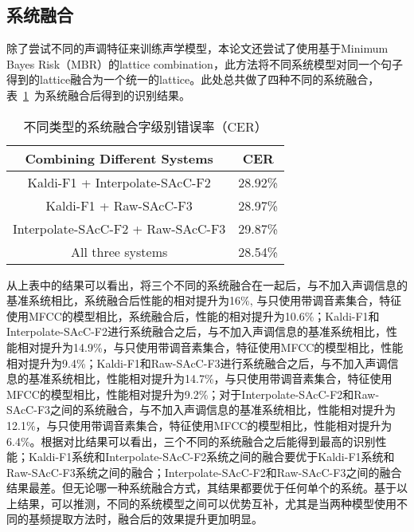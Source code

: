 \subsection{系统融合}
除了尝试不同的声调特征来训练声学模型，本论文还尝试了使用基于Minimum Bayes Risk（MBR）的lattice combination\cite{xu2011minimum}，此方法将不同系统模型对同一个句子得到的lattice融合为一个统一的lattice。此处总共做了四种不同的系统融合，表~\ref{tab:table5}~为系统融合后得到的识别结果。
\begin{table}[htbp]
\caption{不同类型的系统融合字级别错误率（CER）}\label{tab:table5}
\vspace{0.5em}\centering\wuhao
\begin{tabular}{cc}
\toprule[1.5pt]
Combining Different Systems & CER \\
\midrule[1pt]
Kaldi-F1 + Interpolate-SAcC-F2 & 28.92\% \\
Kaldi-F1 + Raw-SAcC-F3 & 28.97\% \\
Interpolate-SAcC-F2 + Raw-SAcC-F3 & 29.87\% \\
All three systems & 28.54\% \\
\bottomrule[1.5pt]
\end{tabular}
\vspace{\baselineskip}
\end{table}

从上表中的结果可以看出，将三个不同的系统融合在一起后，与不加入声调信息的基准系统相比，系统融合后性能的相对提升为16\%, 与只使用带调音素集合，特征使用MFCC的模型相比，系统融合后，性能的相对提升为10.6\%；Kaldi-F1和Interpolate-SAcC-F2进行系统融合之后，与不加入声调信息的基准系统相比，性能相对提升为14.9\%，与只使用带调音素集合，特征使用MFCC的模型相比，性能相对提升为9.4\%；Kaldi-F1和Raw-SAcC-F3进行系统融合之后，与不加入声调信息的基准系统相比，性能相对提升为14.7\%，与只使用带调音素集合，特征使用MFCC的模型相比，性能相对提升为9.2\%；对于Interpolate-SAcC-F2和Raw-SAcC-F3之间的系统融合，与不加入声调信息的基准系统相比，性能相对提升为12.1\%，与只使用带调音素集合，特征使用MFCC的模型相比，性能相对提升为6.4\%。根据对比结果可以看出，三个不同的系统融合之后能得到最高的识别性能；Kaldi-F1系统和Interpolate-SAcC-F2系统之间的融合要优于Kaldi-F1系统和Raw-SAcC-F3系统之间的融合；Interpolate-SAcC-F2和Raw-SAcC-F3之间的融合结果最差。但无论哪一种系统融合方式，其结果都要优于任何单个的系统。基于以上结果，可以推测，不同的系统模型之间可以优势互补，尤其是当两种模型使用不同的基频提取方法时，融合后的效果提升更加明显。
